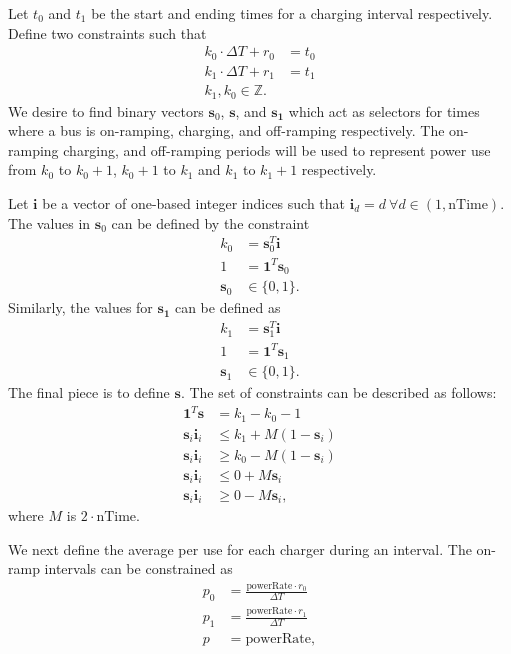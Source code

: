 \documentclass{article}
\begin{document}
Let $t_0$ and $t_1$ be the start and ending times for a charging interval respectively. Define two constraints such that
\begin{align}
	k_0\cdot\Delta T + r_0&= t_0 \\
	k_1\cdot\Delta T + r_1&= t_1 \\
	k_1, k_0 \in \mathbb{Z}.
\end{align}
We desire to find binary vectors $\mathbf{s}_0$, $\mathbf{s}$, and $\mathbf{s_1}$ which act as selectors for times where a bus is on-ramping, charging, and off-ramping respectively. The on-ramping charging, and off-ramping periods will be used to represent power use from $k_0$ to $k_0 + 1$, $k_0 + 1$ to $k_1$ and $k_1$ to $k_1 + 1$ respectively. 
\par Let $\mathbf{i}$ be a vector of one-based integer indices such that $\mathbf{i}_d = d \ \forall d \in (1,\text{nTime})$. The values in $\mathbf{s}_0$ can be defined by the constraint
\begin{align}
	k_0 &= \mathbf{s}_0^T\mathbf{i} \\
	1 &= \mathbf{1}^T\mathbf{s}_0 \\
	\mathbf{s}_0 &\in \{0,1\}.
\end{align}
Similarly, the values for $\mathbf{s_1}$ can be defined as
\begin{align}
	k_1 &= \mathbf{s}_1^T\mathbf{i}\\
	1 &= \mathbf{1}^T\mathbf{s}_1 \\
	\mathbf{s}_1 &\in \{0,1\}.
\end{align}
The final piece is to define $\mathbf{s}$. The set of constraints can be described as follows: 
\begin{align}
	\mathbf{1}^T\mathbf{s} &= k_1 - k_0 - 1 \\
	\mathbf{s}_i\mathbf{i}_i &\le k_1 + M(1 - \mathbf{s}_i)\\
	\mathbf{s}_i\mathbf{i}_i &\ge k_0 - M(1 - \mathbf{s}_i)\\ 
	\mathbf{s}_i\mathbf{i}_i &\le 0 + M\mathbf{s}_i\\
	\mathbf{s}_i\mathbf{i}_i &\ge 0 - M\mathbf{s}_i,
\end{align}
where $M$ is $2\cdot\text{nTime}$.
\par We next define the average per use for each charger during an interval. The on-ramp intervals can be constrained as
\begin{align}
	p_0 &= \frac{\text{powerRate}\cdot r_0}{\Delta T}\\
	p_1 &= \frac{\text{powerRate}\cdot r_1}{\Delta T}\\
	p &= \text{powerRate},
\end{align}
\end{document}
